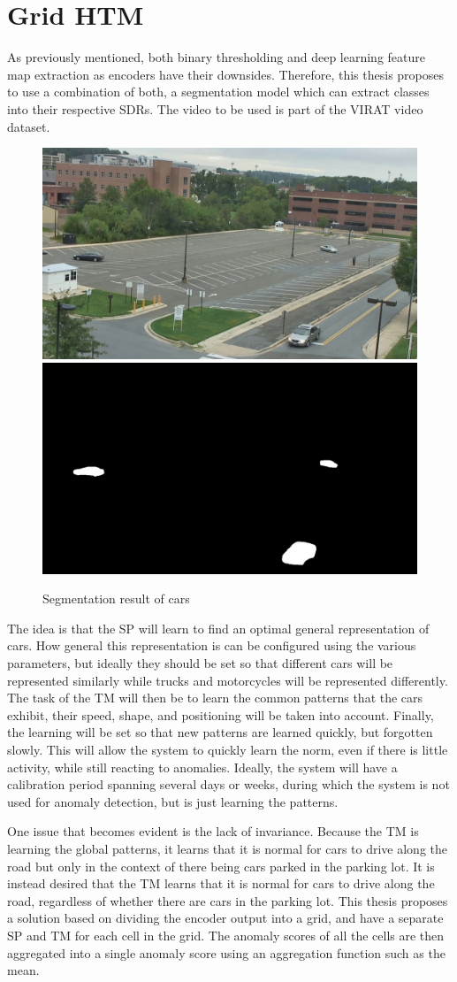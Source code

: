 \chapter{Grid HTM}
As previously mentioned, both binary thresholding and deep learning feature map extraction as encoders have their downsides. Therefore, this thesis proposes to use a combination of both, a segmentation model which can extract classes into their respective SDRs. The video to be used is part of the VIRAT\cite{VIRAT} video dataset.
\begin{figure}[H]
    \centering
    \includegraphics[width=.45\textwidth]{resources/methodology/original.png}\hfill
    \includegraphics[width=.45\textwidth]{resources/methodology/car_segmentation.png}
    \caption{Segmentation result of cars}
    \label{fig:figure3}
\end{figure}
The idea is that the SP will learn to find an optimal general representation of cars. How general this representation is can be configured using the various parameters, but ideally they should be set so that different cars will be represented similarly while trucks and motorcycles will be represented differently. The task of the TM will then be to learn the common patterns that the cars exhibit, their speed, shape, and positioning will be taken into account. Finally, the learning will be set so that new patterns are learned quickly, but forgotten slowly. This will allow the system to quickly learn the norm, even if there is little activity, while still reacting to anomalies. Ideally, the system will have a calibration period spanning several days or weeks, during which the system is not used for anomaly detection, but is just learning the patterns.\par
One issue that becomes evident is the lack of invariance. Because the TM is learning the global patterns, it learns that it is normal for cars to drive along the road but only in the context of there being cars parked in the parking lot. It is instead desired that the TM learns that it is normal for cars to drive along the road, regardless of whether there are cars in the parking lot. This thesis proposes a solution based on dividing the encoder output into a grid, and have a separate SP and TM for each cell in the grid. The anomaly scores of all the cells are then aggregated into a single anomaly score using an aggregation function such as the mean.

